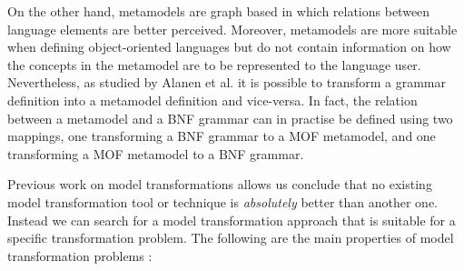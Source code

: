 On the other hand, metamodels are graph based in which relations between language elements are better perceived. Moreover, metamodels are more suitable when defining object-oriented languages but do not contain information on how the concepts in the metamodel are to be represented to the language user\cite{kleppe2007language}. Nevertheless, as studied by Alanen et al. \cite{alanen2003} it is possible to transform a grammar definition into a metamodel definition and vice-versa. In fact, the relation between a metamodel and a BNF grammar can in practise be defined using two mappings, one transforming a BNF grammar to a MOF metamodel,
and one transforming a MOF metamodel to a BNF grammar.

Previous work \cite{Czarnecki2006, biehl2010literature} on model transformations allows us conclude that no existing model transformation tool or technique is \textit{absolutely} better than another one. Instead we can search for a model transformation approach that is suitable for a specific transformation problem. The following are the main properties of model transformation problems \cite{biehl2010literature}:

